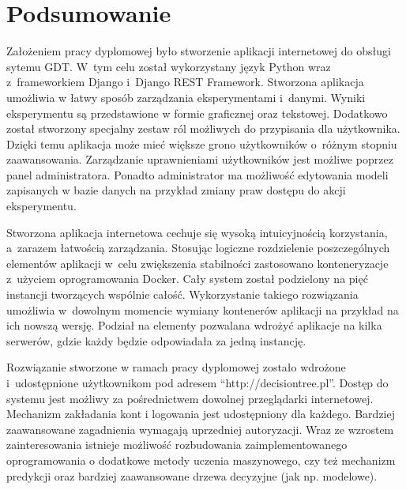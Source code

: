 \chapter*{Podsumowanie}
Założeniem pracy dyplomowej było stworzenie aplikacji internetowej do obsługi sytemu GDT. W~tym celu został wykorzystany język Python wraz z~frameworkiem Django i~Django REST Framework. Stworzona aplikacja umożliwia w łatwy sposób zarządzania eksperymentami i~danymi. Wyniki eksperymentu są przedstawione w formie graficznej oraz tekstowej. Dodatkowo został stworzony specjalny zestaw ról możliwych do przypisania dla użytkownika. Dzięki temu aplikacja może mieć większe grono użytkowników o~różnym stopniu zaawansowania. Zarządzanie uprawnieniami użytkowników jest możliwe poprzez panel administratora. Ponadto administrator ma możliwość edytowania modeli zapisanych w bazie danych na przykład zmiany praw dostępu do akcji eksperymentu. 

Stworzona aplikacja internetowa cechuje się wysoką intuicyjnością korzystania, a~zarazem łatwością zarządzania. Stosując logiczne rozdzielenie poszczególnych elementów aplikacji w~celu zwiększenia stabilności zastosowano konteneryzacje z~użyciem oprogramowania Docker. Cały system został podzielony na pięć instancji tworzących wspólnie całość. Wykorzystanie takiego rozwiązania umożliwia w~dowolnym momencie wymiany kontenerów aplikacji na przykład na ich nowszą wersję. Podział na elementy pozwalana wdrożyć aplikacje na kilka serwerów, gdzie każdy będzie odpowiadała za jedną instancję. 

Rozwiązanie stworzone w ramach pracy dyplomowej zostało wdrożone i~udostępnione użytkownikom pod adresem \enquote{http://decisiontree.pl}. Dostęp do systemu jest możliwy za pośrednictwem dowolnej przeglądarki internetowej. Mechanizm zakładania kont i logowania jest udostępniony dla każdego. Bardziej zaawansowane zagadnienia wymagają uprzedniej autoryzacji. Wraz ze wzrostem zainteresowania istnieje możliwość rozbudowania zaimplementowanego oprogramowania o dodatkowe metody uczenia maszynowego, czy też mechanizm predykcji oraz bardziej zaawansowane drzewa decyzyjne (jak np. modelowe).